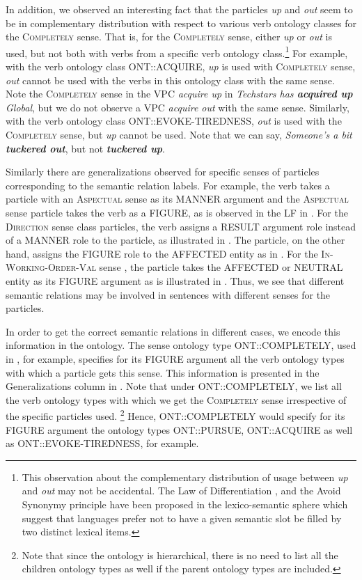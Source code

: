\documentclass[output=paper
,modfonts
,nonflat]{langsci/langscibook}
\begin{document}
In addition, we observed an interesting fact that the particles \textit{up} and \textit{out} seem to be in complementary distribution with respect to various verb ontology classes for the \textsc{Completely} sense. That is, for the \textsc{Completely} sense, either \textit{up} or \textit{out} is used, but not both with verbs from a specific verb ontology class.\footnote{This observation about the complementary distribution of usage between \textit{up} and \textit{out} may not be accidental. The Law of Differentiation \citep{Pau90,Bre00}, and the Avoid Synonymy principle \citep{Kip83,Cla87} have been proposed in the lexico-semantic sphere which suggest that languages prefer not to have a given semantic slot be filled by two distinct lexical items.} For example, with the verb ontology class ONT::ACQUIRE, \textit{up} is used with \textsc{Completely} sense, \textit{out} cannot be used with the verbs in this ontology class with the same sense. Note the \textsc{Completely} sense in the VPC \textit{acquire up} in \textit{Techstars has \textbf{acquired up} Global}, but we do not observe a VPC \textit{acquire out} with the same sense. Similarly, with the verb ontology class ONT::EVOKE-TIREDNESS, \textit{out} is used with the \textsc{Completely} sense, but \textit{up} cannot be used. Note that we can say, \textit{Someone's a bit \textbf{tuckered out}}, but not \textit{\textbf{tuckered up}}.

Similarly there are generalizations observed for specific senses of particles corresponding to the semantic relation labels. For example, the verb takes a particle with an \textsc{Aspectual} sense as its MANNER argument and the \textsc{Aspectual} sense particle takes the verb as a FIGURE, as is observed in the LF in . For the \textsc{Direction} sense class particles, the verb assigns a RESULT argument role instead of a MANNER role to the particle, as illustrated in . The particle, on the other hand, assigns the FIGURE role to the AFFECTED entity as in . For the \textsc{In-Working-Order-Val} sense%
, the particle takes the AFFECTED or NEUTRAL entity as its FIGURE argument as is illustrated in . Thus, we see that different semantic relations may be involved in sentences with different senses for the particles.

In order to get the correct semantic relations in different cases, we encode this information in the ontology. The sense ontology type ONT::COMPLETELY, used in , for example, specifies for its FIGURE argument all the verb ontology types with which a particle gets this sense. This information is presented in %
the Generalizations column in . Note that %
under ONT::COMPLETELY, we list all the verb ontology types with which we get the \textsc{Completely} sense irrespective of the specific particles used.%
\footnote{Note that since the ontology is hierarchical, there is no need to list all the children ontology types as well if the parent ontology types are included.} Hence, ONT::COMPLETELY would specify for its FIGURE argument the ontology types ONT::PURSUE, ONT::ACQUIRE as well as ONT::EVOKE-TIREDNESS, for example. 
\end{document}
